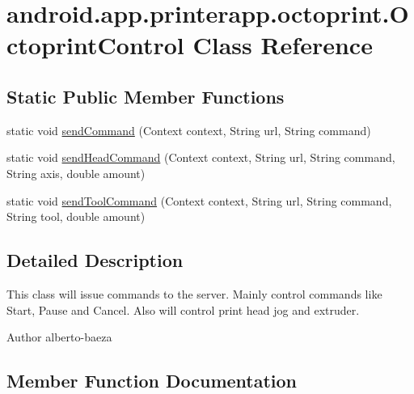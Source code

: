 \hypertarget{classandroid_1_1app_1_1printerapp_1_1octoprint_1_1_octoprint_control}{}\section{android.\+app.\+printerapp.\+octoprint.\+Octoprint\+Control Class Reference}
\label{classandroid_1_1app_1_1printerapp_1_1octoprint_1_1_octoprint_control}
\subsection*{Static Public Member Functions}
\begin{DoxyCompactItemize}
\item 
static void \hyperlink{classandroid_1_1app_1_1printerapp_1_1octoprint_1_1_octoprint_control_ad028268e2f3d12ad732a63513dfe4048}{send\+Command} (Context context, String url, String command)
\item 
static void \hyperlink{classandroid_1_1app_1_1printerapp_1_1octoprint_1_1_octoprint_control_ac9e5702f334b41769f77510b8fb74cae}{send\+Head\+Command} (Context context, String url, String command, String axis, double amount)
\item 
static void \hyperlink{classandroid_1_1app_1_1printerapp_1_1octoprint_1_1_octoprint_control_a482af5ffc6f20425d1bf984f4fbd030b}{send\+Tool\+Command} (Context context, String url, String command, String tool, double amount)
\end{DoxyCompactItemize}


\subsection{Detailed Description}
This class will issue commands to the server. Mainly control commands like Start, Pause and Cancel. Also will control print head jog and extruder. \begin{DoxyAuthor}{Author}
alberto-\/baeza 
\end{DoxyAuthor}


\subsection{Member Function Documentation}
\mbox{\label{classandroid_1_1app_1_1printerapp_1_1octoprint_1_1_octoprint_control_ad028268e2f3d12ad732a63513dfe4048}} 
